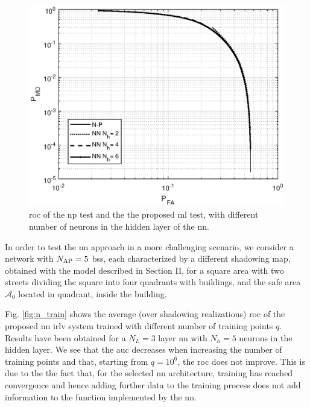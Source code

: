 \documentclass[conference,draftcls,onecolumn]{IEEEtran}
\begin{document}
 \begin{figure}[h]
     \centering
     \includegraphics[width=0.9\columnwidth]{FA_MD_LOS.eps}
     \caption{\ac{roc} of the \ac{np} test and the the proposed \ac{ml} test,  with different number of neurons in the hidden layer of the \ac{nn}.}
     \label{fig:NP_comp}
 \end{figure}

 
In order to test the \ac{nn} approach in a more challenging scenario, we consider a network with $N_{\rm AP}=5$ \acp{bs}, each  characterized by a different  shadowing map, obtained with the model described in Section II, for a square area with two streets dividing the square into four quadrants with buildings, and the safe area $\mathcal A_0$  located in quadrant, inside the building.




Fig. \ref{fig:n_train} shows the average (over shadowing realizations) \ac{roc} of the proposed \ac{nn} \ac{irlv} system  trained with different number of training points $q$. Results have been obtained for a $N_L=3$ layer \ac{nn} with $N_h=5$ neurons in the hidden layer. We see that the \ac{auc} decreases when increasing the number of training points and that, starting from $q=10^6$, the \ac{roc} does not improve. This is due to the the fact that, for the selected \ac{nn} architecture, training has reached convergence and hence adding further data to the training process does not add information to the function implemented by the \ac{nn}. 
\end{document}
